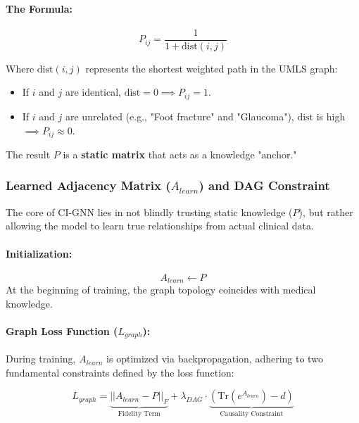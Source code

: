 \paragraph{The Formula:}
\begin{equation}
P_{ij} = \frac{1}{1 + \text{dist}(i, j)}
\end{equation}

Where $\text{dist}(i, j)$ represents the shortest weighted path in the UMLS graph:
\begin{itemize}
    \item If $i$ and $j$ are identical, $\text{dist} = 0 \implies P_{ij} = 1$.
    \item If $i$ and $j$ are unrelated (e.g., "Foot fracture" and "Glaucoma"), $\text{dist}$ is high $\implies P_{ij} \approx 0$.
\end{itemize}

The result $P$ is a \textbf{static matrix} that acts as a knowledge "anchor."

\subsubsection{Learned Adjacency Matrix ($A_{learn}$) and DAG Constraint}

The core of CI-GNN lies in not blindly trusting static knowledge ($P$), but rather allowing the model to learn true relationships from actual clinical data.

\paragraph{Initialization:}
\begin{equation}
A_{learn} \leftarrow P
\end{equation}
At the beginning of training, the graph topology coincides with medical knowledge.

\paragraph{Graph Loss Function ($L_{graph}$):}
During training, $A_{learn}$ is optimized via backpropagation, adhering to two fundamental constraints defined by the loss function:

\begin{equation}
L_{graph} = \underbrace{||A_{learn} - P||_F}_{\text{Fidelity Term}} + \lambda_{DAG} \cdot \underbrace{(\text{Tr}(e^{A_{learn}}) - d)}_{\text{Causality Constraint}}
\end{equation}

